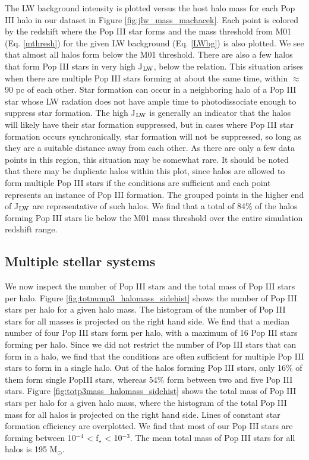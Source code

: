 \documentclass[a4paper,fleqn,usenatbib]{mnras}
\begin{document}
The LW background intensity is plotted versus the host halo mass for each Pop III halo in our dataset in Figure \ref{fig:jlw_mass_machacek}. Each point is colored by the redshift where the Pop III star forms and the mass threshold from M01 (Eq. \ref{mthresh}) for the given LW background (Eq. \ref{LWbg}) is also plotted. We see that almost all halos form below the M01 threshold. There are also a few halos that form Pop III stars in very high J$_{\rm LW}$, below the relation. 
This situation arises when there are multiple Pop III stars forming at about the same time, within $\approx$ 90 pc of each other. Star formation can occur in a neighboring halo of a Pop III star whose LW radation does not have ample time to photodissociate enough \hh{} to suppress star formation. The high J$_{\rm LW}$ is generally an indicator that the halos will likely have their star formation suppressed, but in cases where Pop III star formation occurs synchronically, star formation will not be suppressed, so long as they are a suitable distance away from each other. As there are only a few data points in this region, this situation may be somewhat rare. It should be noted that there may be duplicate halos within this plot, since halos are allowed to form multiple Pop III stars if the conditions are sufficient and each point represents an instance of Pop III formation. The grouped points in the higher end of J$_{\rm LW}$ are representative of such halos. We find that a total of 84\% of the halos forming Pop III stars lie below the M01 mass threshold over the entire simulation redshift range. 

\subsection{Multiple stellar systems}

We now inspect the number of Pop III stars and the total mass of Pop III stars per halo. Figure \ref{fig:totnump3_halomass_sidehist} shows the number of Pop III stars per halo for a given halo mass. The histogram of the number of Pop III stars for all masses is projected on the right hand side. We find that a median number of four Pop III stars form per halo, with a maximum of 16 Pop III stars forming per halo. Since we did not restrict the number of Pop III stars that can form in a halo, we find that the conditions are often sufficient for multiple Pop III stars to form in a single halo. Out of the halos forming Pop III stars, only 16\% of them form single PopIII stars, whereas 54\% form between two and five Pop III stars. Figure \ref{fig:totp3mass_halomass_sidehist} shows the total mass of Pop III stars per halo for a given halo mass, where the histogram of the total Pop III mass for all halos is projected on the right hand side. Lines of constant star formation efficiency are overplotted. We find that most of our Pop III stars are forming between 10$^{-4}$ < f$_\star$ < 10$^{-3}$. The mean total mass of Pop III stars for all halos is 195 M$_{\odot}$.  
\end{document}
